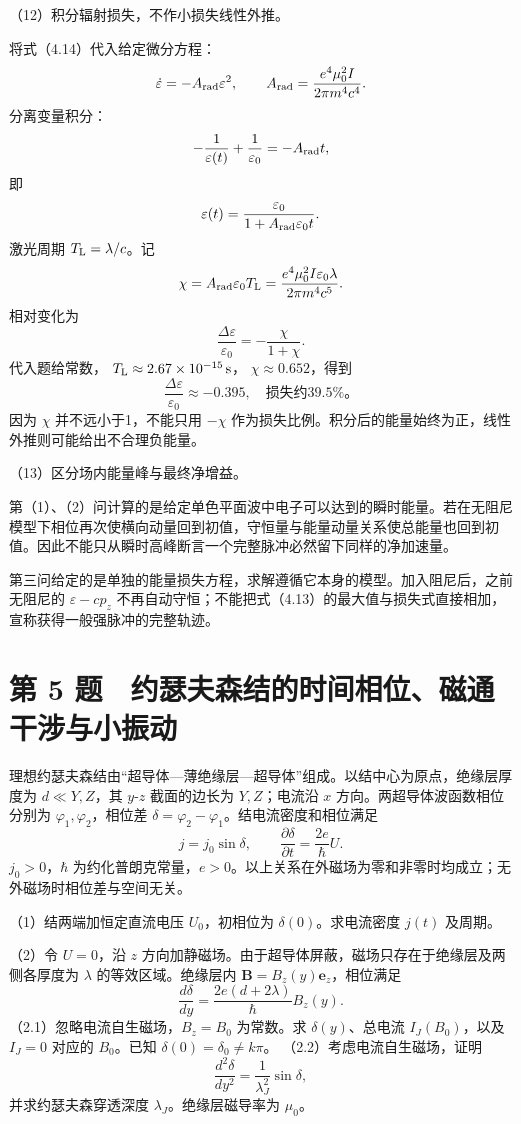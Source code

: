 \documentclass[12pt,a4paper,fontset=fandol]{ctexart}
\begin{document}
（12）积分辐射损失，不作小损失线性外推。

将式（4.14）代入给定微分方程： \[
\dot\varepsilon=-A_{\rm rad}\varepsilon^2,\qquad
A_{\rm rad}=\frac{e^4\mu_0^2I}{2\pi m^4c^4}.
\] 分离变量积分： \[
-\frac1{\varepsilon(t)}+\frac1{\varepsilon_0}
=-A_{\rm rad}t,
\] 即 \[
\varepsilon(t)=\frac{\varepsilon_0}
{1+A_{\rm rad}\varepsilon_0t}.
\] 激光周期 \(T_{\rm L}=\lambda/c\)。记 \[
\chi=A_{\rm rad}\varepsilon_0T_{\rm L}
=\frac{e^4\mu_0^2I\varepsilon_0\lambda}
{2\pi m^4c^5}.
\] 相对变化为 \[
\boxed{\frac{\Delta\varepsilon}{\varepsilon_0}
=-\frac{\chi}{1+\chi}.}\tag{4.15}
\] 代入题给常数， \(T_{\rm L}\approx2.67\times10^{-15}\,\mathrm s\)，
\(\chi\approx0.652\)，得到 \[
\boxed{\frac{\Delta\varepsilon}{\varepsilon_0}
\approx-0.395,\quad\text{损失约39.5\%。}}
\] 因为 \(\chi\) 并不远小于1，不能只用 \(-\chi\)
作为损失比例。积分后的能量始终为正，线性外推则可能给出不合理负能量。

（13）区分场内能量峰与最终净增益。

第（1）、（2）问计算的是给定单色平面波中电子可以达到的瞬时能量。若在无阻尼模型下相位再次使横向动量回到初值，守恒量与能量动量关系使总能量也回到初值。因此不能只从瞬时高峰断言一个完整脉冲必然留下同样的净加速量。

第三问给定的是单独的能量损失方程，求解遵循它本身的模型。加入阻尼后，之前无阻尼的
\(\varepsilon-cp_z\)
不再自动守恒；不能把式（4.13）的最大值与损失式直接相加，宣称获得一般强脉冲的完整轨迹。

\clearpage

\section{第 5
题　约瑟夫森结的时间相位、磁通干涉与小振动}\label{ux7b2c-5-ux9898-ux7ea6ux745fux592bux68eeux7ed3ux7684ux65f6ux95f4ux76f8ux4f4dux78c1ux901aux5e72ux6d89ux4e0eux5c0fux632fux52a8}

理想约瑟夫森结由``超导体---薄绝缘层---超导体''组成。以结中心为原点，绝缘层厚度为
\(d\ll Y,Z\)，其 \(y\)-\(z\) 截面的边长为 \(Y,Z\)；电流沿 \(x\)
方向。两超导体波函数相位分别为 \(\varphi_1,\varphi_2\)，相位差
\(\delta=\varphi_2-\varphi_1\)。结电流密度和相位满足 \[
j=j_0\sin\delta,\qquad
\frac{\partial\delta}{\partial t}=\frac{2e}{\hbar}U.
\] \(j_0>0\)，\(\hbar\)
为约化普朗克常量，\(e>0\)。以上关系在外磁场为零和非零时均成立；无外磁场时相位差与空间无关。

（1）结两端加恒定直流电压 \(U_0\)，初相位为 \(\delta(0)\)。求电流密度
\(j(t)\) 及周期。

（2）令 \(U=0\)，沿 \(z\)
方向加静磁场。由于超导体屏蔽，磁场只存在于绝缘层及两侧各厚度为
\(\lambda\) 的等效区域。绝缘层内
\(\mathbf B=B_z(y)\mathbf e_z\)，相位满足 \[
\frac{d\delta}{dy}=\frac{2e(d+2\lambda)}{\hbar}B_z(y).
\] （2.1）忽略电流自生磁场，\(B_z=B_0\) 为常数。求 \(\delta(y)\)、总电流
\(I_J(B_0)\)，以及 \(I_J=0\) 对应的 \(B_0\)。已知
\(\delta(0)=\delta_0\ne k\pi\)。 （2.2）考虑电流自生磁场，证明 \[
\frac{d^2\delta}{dy^2}=\frac1{\lambda_J^2}\sin\delta,
\] 并求约瑟夫森穿透深度 \(\lambda_J\)。绝缘层磁导率为 \(\mu_0\)。
\end{document}
